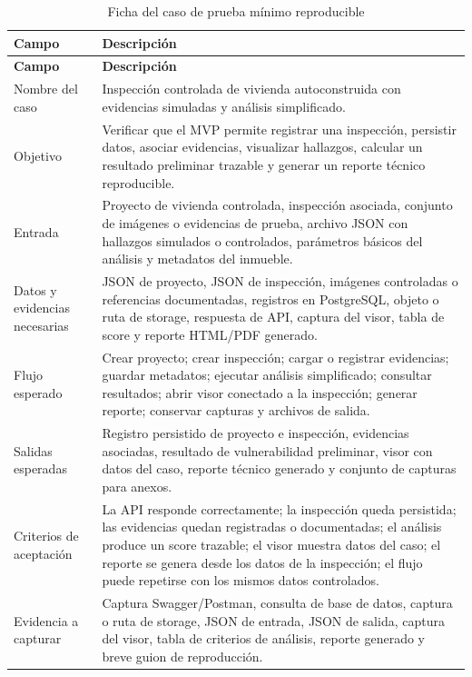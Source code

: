 \documentclass[12pt,oneside]{report}
\begin{document}
\begin{longtable}{>{\raggedright\arraybackslash}p{} >{\raggedright\arraybackslash}p{}}
  \caption{Ficha del caso de prueba mínimo reproducible}
  \label{tab:caso-prueba-minimo}\\
  \toprule
  \textbf{Campo} & \textbf{Descripción} \\
  \midrule
  \endfirsthead
  \toprule
  \textbf{Campo} & \textbf{Descripción} \\
  \midrule
  \endhead
  Nombre del caso & Inspección controlada de vivienda autoconstruida con evidencias simuladas y análisis simplificado. \\
  Objetivo & Verificar que el MVP permite registrar una inspección, persistir datos, asociar evidencias, visualizar hallazgos, calcular un resultado preliminar trazable y generar un reporte técnico reproducible. \\
  Entrada & Proyecto de vivienda controlada, inspección asociada, conjunto de imágenes o evidencias de prueba, archivo JSON con hallazgos simulados o controlados, parámetros básicos del análisis y metadatos del inmueble. \\
  Datos y evidencias necesarias & JSON de proyecto, JSON de inspección, imágenes controladas o referencias documentadas, registros en PostgreSQL, objeto o ruta de storage, respuesta de API, captura del visor, tabla de score y reporte HTML/PDF generado. \\
  Flujo esperado & Crear proyecto; crear inspección; cargar o registrar evidencias; guardar metadatos; ejecutar análisis simplificado; consultar resultados; abrir visor conectado a la inspección; generar reporte; conservar capturas y archivos de salida. \\
  Salidas esperadas & Registro persistido de proyecto e inspección, evidencias asociadas, resultado de vulnerabilidad preliminar, visor con datos del caso, reporte técnico generado y conjunto de capturas para anexos. \\
  Criterios de aceptación & La API responde correctamente; la inspección queda persistida; las evidencias quedan registradas o documentadas; el análisis produce un score trazable; el visor muestra datos del caso; el reporte se genera desde los datos de la inspección; el flujo puede repetirse con los mismos datos controlados. \\
  Evidencia a capturar & Captura Swagger/Postman, consulta de base de datos, captura o ruta de storage, JSON de entrada, JSON de salida, captura del visor, tabla de criterios de análisis, reporte generado y breve guion de reproducción. \\
  \bottomrule
\end{longtable}
\end{document}
